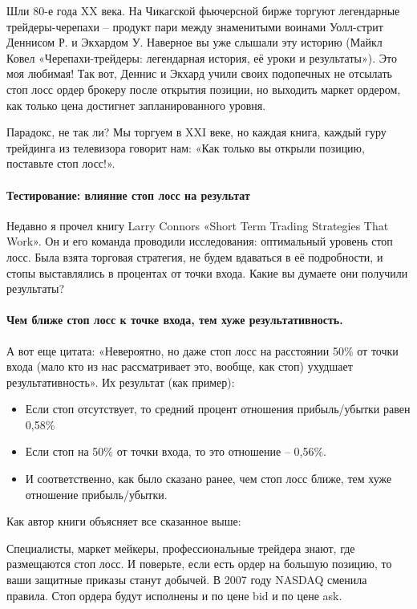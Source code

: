 \documentclass[a5paper]{article}
\begin{document}
Шли 80-е года XX века. На Чикагской фьючерсной бирже торгуют легендарные трейдеры-черепахи – продукт пари между знаменитыми воинами Уолл-стрит Деннисом Р. и Экхардом У. Наверное вы уже слышали эту историю (Майкл Ковел «Черепахи-трейдеры: легендарная история, её уроки и результаты»). Это моя любимая! Так вот, Деннис и Экхард учили своих подопечных не отсылать стоп лосс ордер брокеру после открытия позиции, но выходить маркет ордером, как только цена достигнет запланированного уровня.

Парадокс, не так ли? Мы торгуем в XXI веке, но каждая книга, каждый
гуру трейдинга из телевизора говорит нам: «Как только вы открыли
позицию, поставьте стоп лосс!».

\paragraph{Тестирование: влияние стоп лосс на результат}

Недавно я прочел книгу Larry Connors «Short Term Trading Strategies That Work». Он и его команда проводили исследования: оптимальный уровень стоп лосс. Была взята торговая стратегия, не будем вдаваться в её подробности, и стопы выставлялись в процентах от точки входа. Какие вы думаете они получили результаты?

\paragraph{Чем ближе стоп лосс к точке входа, тем хуже результативность.}

А вот еще цитата: «Невероятно, но даже стоп лосс на расстоянии 50\% от точки входа (мало кто из нас рассматривает это, вообще, как стоп) ухудшает результативность». Их результат (как пример):
\begin{itemize}
\item     Если стоп отсутствует, то средний процент отношения прибыль/убытки равен 0,58\%
\item     Если стоп на 50\% от точки входа, то это отношение – 0,56\%.
\item     И соответственно, как было сказано ранее, чем стоп лосс ближе, тем хуже отношение прибыль/убытки.
\end{itemize}

Как автор книги объясняет все сказанное выше:

    Специалисты, маркет мейкеры, профессиональные трейдера знают, где размещаются стоп лосс. И поверьте, если есть ордер на большую позицию, то ваши защитные приказы станут добычей.
    В 2007 году NASDAQ сменила правила. Стоп ордера будут исполнены и по цене bid и по цене ask.
\end{document}
